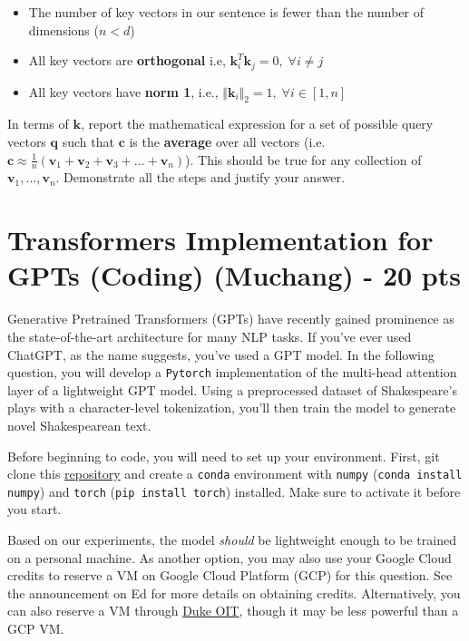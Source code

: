 \documentclass{exam}
\def\v{\mathbf{v}}
\def\k{\mathbf{k}}
\def\q{\mathbf{q}}
\def\c{\mathbf{c}}
\begin{document}
\begin{itemize}
    \item The number of key vectors in our sentence is fewer than the number of dimensions ($n < d$)
    \item All key vectors are \textbf{orthogonal} i.e, $\k_i^T\k_j = 0,\;\forall i \not= j$
    \item All key vectors have \textbf{norm 1}, i.e., $\Vert \k_i \Vert_2 = 1, \;\forall i \in [1, n]$
\end{itemize}

\noindent In terms of $\k$, report the mathematical expression for a set of possible query vectors $\q$ such that $\c$ is the \textbf{average} over all vectors (i.e. $\c \approx \frac{1}{n} (\v_1 +\v_2 + \v_3 + \dots + \v_n)$). This should be true for any collection of $\v_1, \dots, \v_n$. Demonstrate all the steps and justify your answer. 


\section{Transformers Implementation for GPTs (Coding) (Muchang) - 20 pts}

Generative Pretrained Transformers (GPTs) have recently gained prominence as the state-of-the-art architecture for many NLP tasks. If you've ever used ChatGPT, as the name suggests, you've used a GPT model. In the following question, you will develop a \texttt{Pytorch} implementation of the multi-head attention layer of a lightweight GPT model. Using a preprocessed dataset of Shakespeare's plays with a character-level tokenization, you'll then train the model to generate novel Shakespearean text. 

Before beginning to code, you will need to set up your environment. First, git clone this \href{https://github.com/mbahng/gpt2-pytorch}{repository} and create a \texttt{conda} environment with \texttt{numpy} (\texttt{conda install numpy}) and \texttt{torch} (\texttt{pip install torch}) installed. Make sure to activate it before you start. 

Based on our experiments, the model \emph{should} be lightweight enough to be trained on a personal machine. As another option, you may also use your Google Cloud credits to reserve a VM on Google Cloud Platform (GCP) for this question. See the announcement on Ed for more details on obtaining credits. Alternatively, you can also reserve a VM through \href{https://vcm.duke.edu/apps/index}{Duke OIT}, though it may be less powerful than a GCP VM. 
\end{document}
